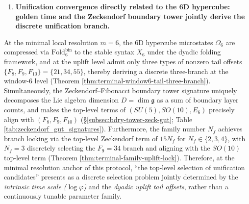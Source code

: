\begin{enumerate}
  \item \textbf{Unification convergence directly related to the 6D hypercube: golden time and the Zeckendorf boundary tower jointly derive the discrete unification branch.}
  \end{enumerate}

\begin{theorem}
\label{thm:terminal-6d-microstate-golden-time-gut-branch}
At the minimal local resolution \(m=6\), the 6D hypercube microstates \(\Omega_6\) are compressed via \(\mathrm{Fold}^{\mathrm{bin}}_6\) to the stable syntax \(X_6\) under the dyadic folding framework, and at the uplift level admit only three types of nonzero tail offsets \(\{F_8,F_9,F_{10}\}=\{21,34,55\}\), thereby deriving a discrete three-branch at the window-\(6\) level (Theorem \ref{thm:terminal-window6-tail-three-branch}).
Simultaneously, the Zeckendorf--Fibonacci boundary tower signature uniquely decomposes the Lie algebra dimension \(D=\dim\mathfrak g\) as a sum of boundary layer counts, and makes the top-level terms of \((SU(5),SO(10),E_6)\) precisely align with \((F_8,F_9,F_{10})\) (\S\ref{subsec:bdry-tower-zeck-gut}; Table \ref{tab:zeckendorf_gut_signatures}).
Furthermore, the family number \(N_f\) achieves branch locking via the top-level Zeckendorf term of \(15N_f\) for \(N_f\in\{2,3,4\}\), with \(N_f=3\) discretely selecting the \(F_9=34\) branch and aligning with the \(SO(10)\) top-level term (Theorem \ref{thm:terminal-family-uplift-lock}).
Therefore, at the minimal resolution anchor of this protocol, ``the top-level selection of unification candidates'' presents as a discrete selection problem jointly determined by the \emph{intrinsic time scale (\(\log\varphi\))} and the \emph{dyadic uplift tail offsets}, rather than a continuously tunable parameter family.
\end{theorem}

